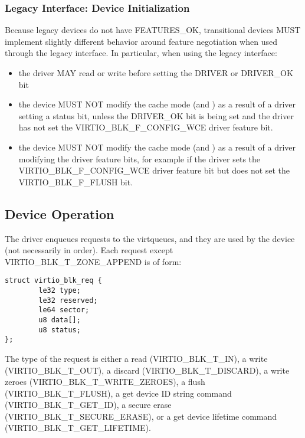 \subsubsection{Legacy Interface: Device Initialization}\label{sec:Device Types / Block Device / Device Initialization / Legacy Interface: Device Initialization}

Because legacy devices do not have FEATURES_OK, transitional devices
MUST implement slightly different behavior around feature negotiation
when used through the legacy interface.  In particular, when using the
legacy interface:

\begin{itemize}
\item the driver MAY read or write  before setting
  the DRIVER or DRIVER_OK  bit

\item the device MUST NOT modify the cache mode (and )
  as a result of a driver setting a status bit, unless
  the DRIVER_OK bit is being set and the driver has not set the
  VIRTIO_BLK_F_CONFIG_WCE driver feature bit.

\item the device MUST NOT modify the cache mode (and )
  as a result of a driver modifying the driver feature bits, for example
  if the driver sets the VIRTIO_BLK_F_CONFIG_WCE driver feature bit but
  does not set the VIRTIO_BLK_F_FLUSH bit.
\end{itemize}


\subsection{Device Operation}\label{sec:Device Types / Block Device / Device Operation}

The driver enqueues requests to the virtqueues, and they are used by
the device (not necessarily in order). Each request except
VIRTIO_BLK_T_ZONE_APPEND is of form:

\begin{lstlisting}
struct virtio_blk_req {
        le32 type;
        le32 reserved;
        le64 sector;
        u8 data[];
        u8 status;
};
\end{lstlisting}

The type of the request is either a read (VIRTIO_BLK_T_IN), a write
(VIRTIO_BLK_T_OUT), a discard (VIRTIO_BLK_T_DISCARD), a write zeroes
(VIRTIO_BLK_T_WRITE_ZEROES), a flush (VIRTIO_BLK_T_FLUSH), a get device ID
string command (VIRTIO_BLK_T_GET_ID), a secure erase
(VIRTIO_BLK_T_SECURE_ERASE), or a get device lifetime command
(VIRTIO_BLK_T_GET_LIFETIME).

